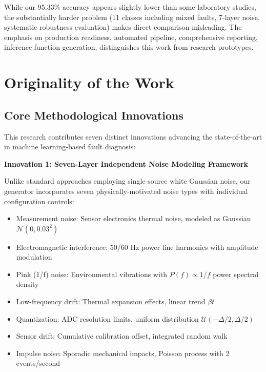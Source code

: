 \documentclass[11pt,a4paper]{article}
\begin{document}
While our 95.33\% accuracy appears slightly lower than some laboratory studies, the substantially harder problem (11 classes including mixed faults, 7-layer noise, systematic robustness evaluation) makes direct comparison misleading. The emphasis on production readiness, automated pipeline, comprehensive reporting, inference function generation, distinguishes this work from research prototypes.

\section{Originality of the Work}

\subsection{Core Methodological Innovations}

This research contributes seven distinct innovations advancing the state-of-the-art in machine learning-based fault diagnosis:

\textbf{Innovation 1: Seven-Layer Independent Noise Modeling Framework}

Unlike standard approaches employing single-source white Gaussian noise, our generator incorporates seven physically-motivated noise types with individual configuration controls:
\begin{itemize}[itemsep=0.2em]
    \item Measurement noise: Sensor electronics thermal noise, modeled as Gaussian $\mathcal{N}(0, 0.03^2)$
    \item Electromagnetic interference: 50/60 Hz power line harmonics with amplitude modulation
    \item Pink (1/f) noise: Environmental vibrations with $P(f) \propto 1/f$ power spectral density
    \item Low-frequency drift: Thermal expansion effects, linear trend $\beta t$
    \item Quantization: ADC resolution limits, uniform distribution $\mathcal{U}(-\Delta/2, \Delta/2)$
    \item Sensor drift: Cumulative calibration offset, integrated random walk
    \item Impulse noise: Sporadic mechanical impacts, Poisson process with 2 events/second
\end{itemize}
\end{document}
